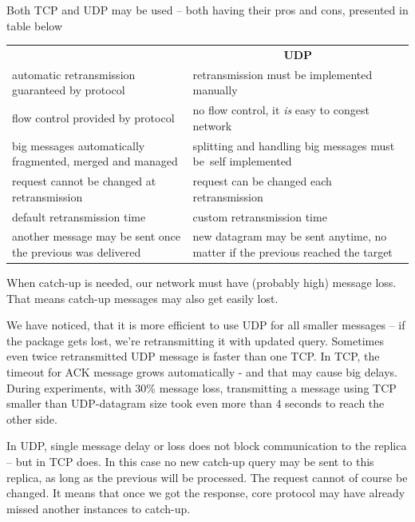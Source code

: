 Both TCP and UDP may be used -- both having their pros and cons, presented in table below

\begin{center}
\small
\begin{tabular}{>{\raggedleft\hspace{0pt}}m{}m{}}

\multicolumn{1}{c}{ \textbf{TCP} }& \multicolumn{1}{c}{ \textbf{UDP} } \\ 
automatic retransmission guaranteed by protocol &
                                retransmission must be implemented manually \\ 
flow control provided by protocol & no flow control, it \emph{is} easy to congest network \\
big messages automatically fragmented, mer\-ged and managed &
                                splitting and handling big messages must be~self implemented \vspace{0.5em} \\

request cannot be changed at retransmission &
                                request can be changed each retransmission \\
default retransmission time & custom retransmission time \\
another message may be sent once the previous was delivered &
                                new datagram may be sent anytime, no matter if the previous reached the target \\

\end{tabular}
\end{center}

When catch-up is needed,  our network must have (probably high) message loss. That means catch-up messages may also get easily lost.

We have noticed, that it is more efficient to use UDP for all smaller messages -- if the package gets lost, we're retransmitting it with updated query. Sometimes even twice retransmitted UDP message is faster than one TCP. In TCP, the timeout for ACK message grows automatically - and that may cause big delays. During experiments, with 30\% message loss, transmitting a message using TCP smaller than UDP-datagram size took even more than 4 seconds to reach the other side.

In UDP, single message delay or loss does not block communication to the replica -- but in TCP does.
In this case no new catch-up query may be sent to this replica, as long as the previous will be processed. The request cannot of course be changed. It means that once we got the response, core protocol may have already missed another instances to catch-up.

